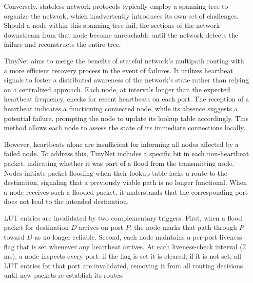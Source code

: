 Conversely, stateless network protocols typically employ a spanning tree to organize the network, which inadvertently introduces its own set of challenges. Should a node within this spanning tree fail, the sections of the network downstream from that node become unreachable until the network detects the failure and reconstructs the entire tree.

TinyNet aims to merge the benefits of stateful network's multipath routing with a more efficient recovery process in the event of failures. It utilizes heartbeat signals to foster a distributed awareness of the network's state rather than relying on a centralized approach. Each node, at intervals longer than the expected heartbeat frequency, checks for recent heartbeats on each port. The reception of a heartbeat indicates a functioning connected node, while its absence suggests a potential failure, prompting the node to update its lookup table accordingly. This method allows each node to assess the state of its immediate connections locally.

However, heartbeats alone are insufficient for informing all nodes affected by a failed node. To address this, TinyNet includes a specific bit in each non-heartbeat packet, indicating whether it was part of a flood from the transmitting node. Nodes initiate packet flooding when their lookup table lacks a route to the destination, signaling that a previously viable path is no longer functional. When a node receives such a flooded packet, it understands that the corresponding port does not lead to the intended destination.

LUT entries are invalidated by two complementary triggers. First, when a flood packet for destination $D$ arrives on port $P$, the node marks that path through $P$ toward $D$ as no longer reliable. Second, each node maintains a per-port liveness flag that is set whenever any heartbeat arrives. At each liveness-check interval (2\,ms), a node inspects every port: if the flag is set it is cleared; if it is not set, all LUT entries for that port are invalidated, removing it from all routing decisions until new packets re-establish its routes.

